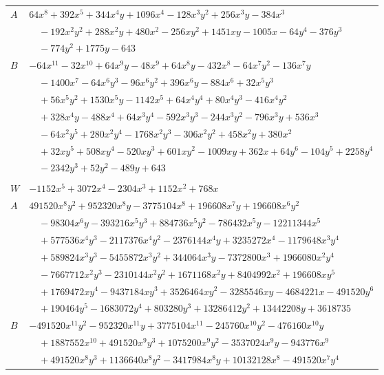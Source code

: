 \documentclass[11pt]{article}
\begin{document}
\begin{longtable}{@{}ll@{}}
$A$ & $64x^{8}+392x^{5}+344x^{4}y+1096x^{4}-128x^{3}y^{2}+256x^{3}y-384x^{3}$\\
 & $\quad -192x^{2}y^{2}+288x^{2}y+480x^{2}-256xy^{2}+1451xy-1005x-64y^{4}-376y^{3}$\\
 & $\quad -774y^{2}+1775y-643$\\
$B$ & $-64x^{11}-32x^{10}+64x^{9}y-48x^{9}+64x^{8}y-432x^{8}-64x^{7}y^{2}-136x^{7}y$\\
 & $\quad -1400x^{7}-64x^{6}y^{3}-96x^{6}y^{2}+396x^{6}y-884x^{6}+32x^{5}y^{3}$\\
 & $\quad +56x^{5}y^{2}+1530x^{5}y-1142x^{5}+64x^{4}y^{4}+80x^{4}y^{3}-416x^{4}y^{2}$\\
 & $\quad +328x^{4}y-488x^{4}+64x^{3}y^{4}-592x^{3}y^{3}-244x^{3}y^{2}-796x^{3}y+536x^{3}$\\
 & $\quad -64x^{2}y^{5}+280x^{2}y^{4}-1768x^{2}y^{3}-306x^{2}y^{2}+458x^{2}y+380x^{2}$\\
 & $\quad +32xy^{5}+508xy^{4}-520xy^{3}+601xy^{2}-1009xy+362x+64y^{6}-104y^{5}+2258y^{4}$\\
 & $\quad -2342y^{3}+52y^{2}-489y+643$\\
\addlinespace[3pt]
\multicolumn{2}{@{}l}{$i=31$, $m=64$, neighbours $47,0,3,8,21,24,26,34,35$}\\
$W$ & $-1152x^{5}+3072x^{4}-2304x^{3}+1152x^{2}+768x$\\
$A$ & $491520x^{8}y^{2}+952320x^{8}y-3775104x^{8}+196608x^{7}y+196608x^{6}y^{2}$\\
 & $\quad -98304x^{6}y-393216x^{5}y^{3}+884736x^{5}y^{2}-786432x^{5}y-12211344x^{5}$\\
 & $\quad +577536x^{4}y^{3}-2117376x^{4}y^{2}-2376144x^{4}y+3235272x^{4}-1179648x^{3}y^{4}$\\
 & $\quad +589824x^{3}y^{3}-5455872x^{3}y^{2}+344064x^{3}y-7372800x^{3}+1966080x^{2}y^{4}$\\
 & $\quad -7667712x^{2}y^{3}-2310144x^{2}y^{2}+1671168x^{2}y+8404992x^{2}+196608xy^{5}$\\
 & $\quad +1769472xy^{4}-9437184xy^{3}+3526464xy^{2}-3285546xy-4684221x-491520y^{6}$\\
 & $\quad +190464y^{5}-1683072y^{4}+803280y^{3}+13286412y^{2}+13442208y+3618735$\\
$B$ & $-491520x^{11}y^{2}-952320x^{11}y+3775104x^{11}-245760x^{10}y^{2}-476160x^{10}y$\\
 & $\quad +1887552x^{10}+491520x^{9}y^{3}+1075200x^{9}y^{2}-3537024x^{9}y-943776x^{9}$\\
 & $\quad +491520x^{8}y^{3}+1136640x^{8}y^{2}-3417984x^{8}y+10132128x^{8}-491520x^{7}y^{4}$\\

\end{longtable}
\end{document}
